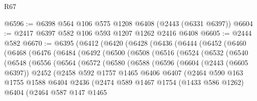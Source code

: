 \begin{lexlean}{R67}
\begin{coremodule}
@6596 := @6398 @564 @106 @575 @1208 @6408 (@2443 (@6331 @6397))
@6604 := @2417 @6397 @582 @106 @593 @1207 @1262 @2416 @6408
@6605 := @2444 @582
@6670 := @6395
    (@6412
      (@6420
        (@6428
          (@6436
            (@6444
              (@6452
                (@6460
                  (@6468
                    (@6476
                      (@6484
                        (@6492
                          (@6500
                            (@6508
                              (@6516
                                (@6524
                                  (@6532
                                    (@6540
                                      (@6548
                                        (@6556
                                          (@6564
                                            (@6572
                                              (@6580
                                                (@6588
                                                  (@6596
                                                    (@6604
                                                      (@2443 (@6605 @6397))
                                                      @2452
                                                      (@2458
                                                        @592
                                                        @1757
                                                        @1465
                                                        @6406
                                                        @6407
                                                        (@2464
                                                          @590
                                                          @163
                                                          @1755
                                                          @1588
                                                          @6404
                                                          @2436
                                                          (@2474
                                                            @589
                                                            @1467
                                                            @1754
                                                            (@1433 @586 @1262)
                                                            @6404
                                                            (@2464
                                                              @587
                                                              @147
                                                              @1465

\end{coremodule}
\end{lexlean}
